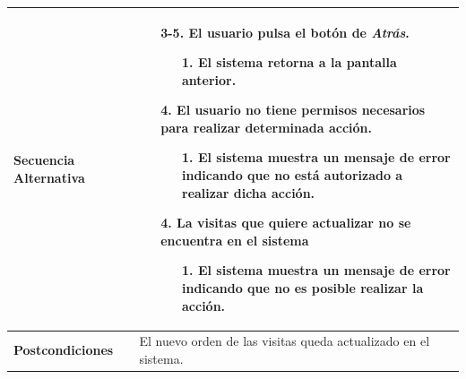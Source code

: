\begin{longtable}{| p{4cm} | p{10cm} |}
\\
\hline
\textbf{Secuencia Alternativa} &\mbox{}\par\vspace{-\baselineskip}
\begin{enumerate}[leftmargin=0.9cm, topsep=0.1cm]
\item[3-5.] El usuario pulsa el botón de \textit{Atrás}.
	\begin{itemize}
	\item[1.] El sistema retorna a la pantalla anterior.
	\end{itemize}
\item[4.] El usuario no tiene permisos necesarios para realizar determinada acción.
	\begin{itemize}
	\item[1.] El sistema muestra un mensaje de error indicando que no está autorizado a realizar dicha acción.
	\end{itemize}
\item[4.] La visitas que quiere actualizar no se encuentra en el sistema
	\begin{itemize}
	\item[1.] El sistema muestra un mensaje de error indicando que no es posible realizar la acción.
	\end{itemize}
\end{enumerate}
\\

\hline
\textbf{Postcondiciones} & 
El nuevo orden de las visitas queda actualizado en el sistema.\\
\hline
\end{longtable}



\newpage
